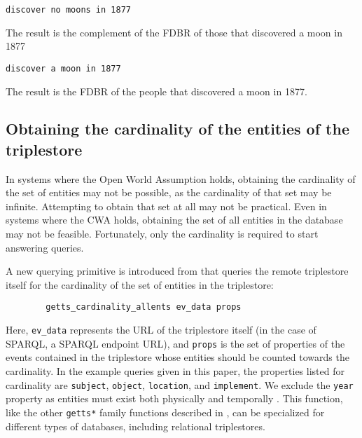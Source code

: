 \documentclass[../main.tex]{subfiles}
\begin{document}
\begin{refsection}
\examplespacing

\texttt{discover no moons in 1877}

\examplespacing

\noindent The result is the complement of the FDBR of those that discovered a moon in 1877

\examplespacing

\texttt{discover a moon in 1877}

\examplespacing

\noindent The result is the FDBR of the people that discovered a moon in 1877.

\subsection{Obtaining the cardinality of the entities of the triplestore}

In systems where the Open World Assumption holds, obtaining the cardinality of the set of entities
may not be possible, as the cardinality of that set may be infinite.  Attempting to obtain that set at all may not be practical.  Even in systems where the CWA holds, obtaining the set of all entities in the database may not be feasible.  Fortunately, only the cardinality is required to start answering queries.

A new querying primitive is introduced from \cite{peelar2020webistjournal} that queries the remote triplestore itself for the cardinality of the set of entities in the triplestore:

\begin{verbatim}
        getts_cardinality_allents ev_data props
\end{verbatim}

Here, \texttt{ev\_data} represents the URL of the triplestore itself (in the case of SPARQL, a SPARQL endpoint URL), and \texttt{props} is the set of properties of the events contained in the triplestore whose entities should be counted towards the cardinality.  In the example queries given in this paper, the properties listed for cardinality are \texttt{subject}, \texttt{object}, \texttt{location}, and \texttt{implement}.  We exclude the \texttt{year} property as entities must exist both physically and temporally \cite{w3csemanticweb}.  This function, like the other  \texttt{getts*} family functions described in \cite{frostpeelar2019}, can be specialized for different types of databases, including relational triplestores.


\end{refsection}
\end{document}
